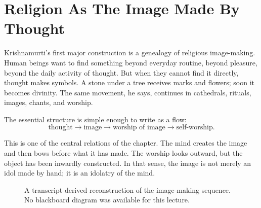 \section{Religion As The Image Made By Thought}

Krishnamurti's first major construction is a genealogy of religious image-making. Human beings want to find something beyond everyday routine, beyond pleasure, beyond the daily activity of thought. But when they cannot find it directly, thought makes symbols. A stone under a tree receives marks and flowers; soon it becomes divinity. The same movement, he says, continues in cathedrals, rituals, images, chants, and worship.

The essential structure is simple enough to write as a flow:
\begin{equation}
\text{thought}
\longrightarrow
\text{image}
\longrightarrow
\text{worship of image}
\longrightarrow
\text{self-worship}.
\end{equation}

This is one of the central relations of the chapter. The mind creates the image and then bows before what it has made. The worship looks outward, but the object has been inwardly constructed. In that sense, the image is not merely an idol made by hand; it is an idolatry of the mind.

\begin{figure}
\centering
{}
\caption{A transcript-derived reconstruction of the image-making sequence. No blackboard diagram was available for this lecture.}
\end{figure}

